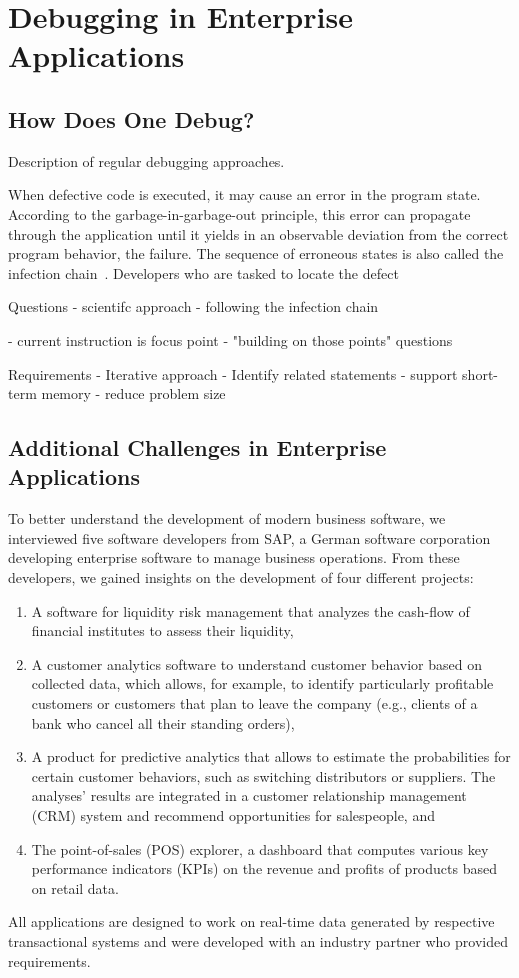 \chapter{Debugging in Enterprise Applications}

\section{How Does One Debug?}

Description of regular debugging approaches.

When defective code is executed, it may cause an error in the program state.
According to the garbage-in-garbage-out principle, this error can propagate through the application until it yields in an observable deviation from the correct program behavior, the failure.
The sequence of erroneous states is also called the infection chain~\cite{zeller_09_why_programs_fail}.
Developers who are tasked to locate the defect

Questions
- scientifc approach
- following the infection chain

- current instruction is focus point
- "building on those points" questions 

Requirements
- Iterative approach
- Identify related statements
- support short-term memory
- reduce problem size

\section{Additional Challenges in Enterprise Applications}

\tmpStart
To better understand the development of modern business software, we interviewed five software developers from SAP, a German software corporation developing enterprise software to manage business operations.
From these developers, we gained insights on the development of four different projects:
\begin{enumerate}
	\item A software for liquidity risk management that analyzes the cash-flow of financial institutes to assess their liquidity,
	\item A customer analytics software to understand customer behavior based on collected data, which allows, for example, to identify particularly profitable customers or customers that plan to leave the company (e.g., clients of a bank who cancel all their standing orders),
	\item A product for predictive analytics that allows to estimate the probabilities for certain customer behaviors, such as switching distributors or suppliers. The analyses' results are integrated in a customer relationship management (CRM) system and recommend opportunities for salespeople, and
	\item The point-of-sales (POS) explorer, a dashboard that computes various key performance indicators (KPIs) on the revenue and profits of products based on retail data.
\end{enumerate}
%
All applications are designed to work on real-time data generated by respective transactional systems and were developed with an industry partner who provided requirements.


